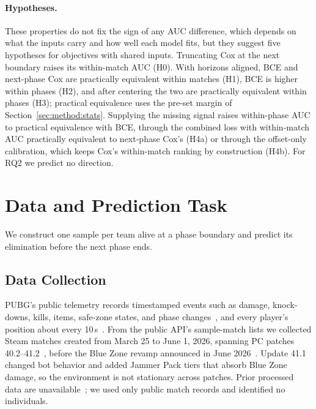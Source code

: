 \documentclass[sigconf,anonymous]{acmart}
\begin{document}
\paragraph{Hypotheses.}
These properties do not fix the sign of any AUC difference, which depends on what the inputs carry and how well each model fits, but they suggest five hypotheses for objectives with shared inputs. Truncating Cox at the next boundary raises its within-match AUC (H0). With horizons aligned, BCE and next-phase Cox are practically equivalent within matches (H1), BCE is higher within phases (H2), and after centering the two are practically equivalent within phases (H3); practical equivalence uses the pre-set margin of Section~\ref{sec:method:stats}. Supplying the missing signal raises within-phase AUC to practical equivalence with BCE, through the combined loss with within-match AUC practically equivalent to next-phase Cox's (H4a) or through the offset-only calibration, which keeps Cox's within-match ranking by construction (H4b). For RQ2 we predict no direction.

\section{Data and Prediction Task}
\label{sec:method}
We construct one sample per team alive at a phase boundary and predict its elimination before the next phase ends.


\subsection{Data Collection}
\label{sec:method:data}
PUBG's public telemetry records timestamped events such as damage, knock-downs, kills, items, safe-zone states, and phase changes~\cite{PUBGAPI}, and every player's position about every 10\,s~\cite{Sagong25a}. From the public API's sample-match lists we collected Steam matches created from March 25 to June 1, 2026, spanning PC patches 40.2--41.2~\cite{PUBGPatchNotes2026}, before the Blue Zone revamp announced in June 2026~\cite{PUBGBlueZone2026}. Update 41.1 changed bot behavior and added Jammer Pack tiers that absorb Blue Zone damage, so the environment is not stationary across patches. Prior processed data are unavailable~\cite{Sagong25a,KRAFTON}; we used only public match records and identified no individuals.
\end{document}
